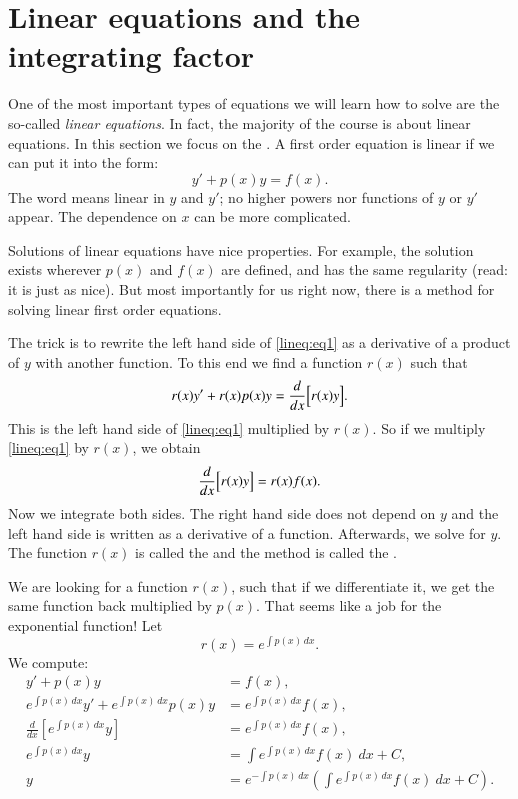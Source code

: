 \documentclass[12pt]{book}
\begin{document}
\sectionnewpage
\section{Linear equations and the integrating factor}


One of the most important types of equations we will learn how to solve are
the so-called
\emph{linear equations}.
In fact, the majority of the course is about linear
equations.  In this section we focus on the
\emph{}.
A first order equation is linear if we can put it
into the form:
\begin{equation} \label{lineq:eq1}
y' + p(x) y = f(x) .
\end{equation}
The word
 means linear in $y$ and $y'$;
no higher powers nor functions of $y$ or $y'$ appear.
The dependence on $x$ can be more
complicated.

Solutions of linear equations have nice properties.  For example, the
solution exists wherever $p(x)$ and $f(x)$ are defined, and has the same
regularity (read: it is just as nice).  But most importantly for us right now,
there is a method for solving linear first order equations.

The trick is to rewrite the left hand side
of \eqref{lineq:eq1} as a derivative of a product of $y$ with another
function.
To this end
we find a function $r(x)$ such that
\begin{equation*}
r(x) y' + r(x) p(x) y = \frac{d}{dx}\Bigl[ r(x) y \Bigr] .
\end{equation*}
This is the left hand side of
\eqref{lineq:eq1} multiplied by $r(x)$.  So if we multiply \eqref{lineq:eq1} by
$r(x)$, we obtain
\begin{equation*}
\frac{d}{dx}\Bigl[ r(x) y \Bigr] = r(x)f(x) .
\end{equation*}
Now we integrate both sides.
The right hand side does not depend on $y$ and the left hand side
is written as a derivative of a function.  Afterwards, we solve for $y$.
The function $r(x)$ is called the \emph{} and the
method is called the \emph{}.

We are looking for a function $r(x)$, such that if
we differentiate it, we get the same function back multiplied by $p(x)$.
That seems like a job for the exponential function!  Let
\begin{equation*}
r(x) = e^{\int p(x) \,dx} .
\end{equation*}
We compute:
\begin{align*}
y' + p(x) y &= f(x) , \\
e^{\int p(x) \,dx} y' + e^{\int p(x) \,dx} p(x) y & = e^{\int p(x) \,dx} f(x) , \\
\frac{d}{dx}\left[ e^{\int p(x) \,dx} y \right] & = e^{\int p(x) \,dx} f(x) , \\
e^{\int p(x) \,dx} y & = \int e^{\int p(x) \,dx} f(x) ~dx + C , \\
y & = e^{-\int p(x) \,dx} \left( \int e^{\int p(x) \,dx} f(x) ~dx + C \right) .
\end{align*}
\end{document}
